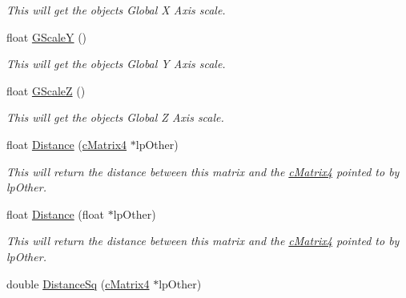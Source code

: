\begin{DoxyCompactItemize}
\begin{DoxyCompactList}\small\item\em This will get the objects Global X Axis scale. \end{DoxyCompactList}\item 
\hypertarget{classc_matrix4_aa9493e86b746ba33d0135d4adcf74b3e}{
float \hyperlink{classc_matrix4_aa9493e86b746ba33d0135d4adcf74b3e}{GScaleY} ()}
\label{classc_matrix4_aa9493e86b746ba33d0135d4adcf74b3e}

\begin{DoxyCompactList}\small\item\em This will get the objects Global Y Axis scale. \end{DoxyCompactList}\item 
\hypertarget{classc_matrix4_af5ad4a4ea96eb13c9c12b6edfa1f96c2}{
float \hyperlink{classc_matrix4_af5ad4a4ea96eb13c9c12b6edfa1f96c2}{GScaleZ} ()}
\label{classc_matrix4_af5ad4a4ea96eb13c9c12b6edfa1f96c2}

\begin{DoxyCompactList}\small\item\em This will get the objects Global Z Axis scale. \end{DoxyCompactList}\item 
\hypertarget{classc_matrix4_acd04bb06d1d12807b203b0aaf9e9b608}{
float \hyperlink{classc_matrix4_acd04bb06d1d12807b203b0aaf9e9b608}{Distance} (\hyperlink{classc_matrix4}{cMatrix4} $\ast$lpOther)}
\label{classc_matrix4_acd04bb06d1d12807b203b0aaf9e9b608}

\begin{DoxyCompactList}\small\item\em This will return the distance between this matrix and the \hyperlink{classc_matrix4}{cMatrix4} pointed to by lpOther. \end{DoxyCompactList}\item 
\hypertarget{classc_matrix4_a83fd4655f67a81cb42f3c50262ec593e}{
float \hyperlink{classc_matrix4_a83fd4655f67a81cb42f3c50262ec593e}{Distance} (float $\ast$lpOther)}
\label{classc_matrix4_a83fd4655f67a81cb42f3c50262ec593e}

\begin{DoxyCompactList}\small\item\em This will return the distance between this matrix and the \hyperlink{classc_matrix4}{cMatrix4} pointed to by lpOther. \end{DoxyCompactList}\item 
\hypertarget{classc_matrix4_afb4a1edc36d2de9330e48bd182fe2a9b}{
double \hyperlink{classc_matrix4_afb4a1edc36d2de9330e48bd182fe2a9b}{DistanceSq} (\hyperlink{classc_matrix4}{cMatrix4} $\ast$lpOther)}
\label{classc_matrix4_afb4a1edc36d2de9330e48bd182fe2a9b}


\end{DoxyCompactItemize}
